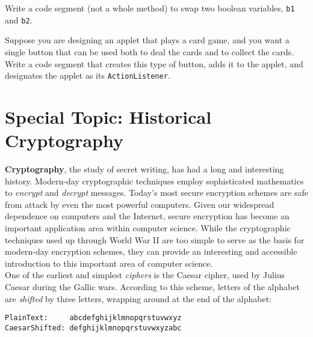 


\begin{SSTUDY}

\item  Write a code segment (not a whole method) to swap
two boolean variables, {\tt b1} and {\tt b2}.

\item  Suppose you are designing an applet that plays a
card game, and you want a single button that can
be used both to deal the cards and to collect the cards.
Write a code segment that creates this type of button,
adds it to the applet, and designates the applet as its
{\tt ActionListener}.

\end{SSTUDY}

\pagebreak
\section*{{\color{cyan}Special Topic:} Historical Cryptography}

{\bf Cryptography}, the study of secret writing,
has had a long and interesting history.   Modern-day cryptographic
techniques employ sophisticated mathematics to
{\it encrypt} and {\it decrypt} messages.  Today's most
\mbox{secure} encryption schemes are safe from attack by even the most
powerful computers.   Given our widespread dependence on computers and
the Internet, secure encryption has become an important application
area within computer science.  While the cryptographic techniques used up
through World War II are too simple to serve as the basis for modern-day encryption 
schemes, they can provide an interesting and accessible
introduction to this important area of computer science.\\
\hspace*{1pc}One of the earliest and simplest {\it ciphers} is the
Caesar cipher, used by Julius Caesar during the
Gallic wars.  According to this scheme, letters of the alphabet are
{\it shifted} by three letters, wrapping around at the end of the
alphabet:

\begin{jjjlisting}
\begin{lstlisting}
PlainText:     abcdefghijklmnopqrstuvwxyz
CaesarShifted: defghijklmnopqrstuvwxyzabc
\end{lstlisting}
\end{jjjlisting}

